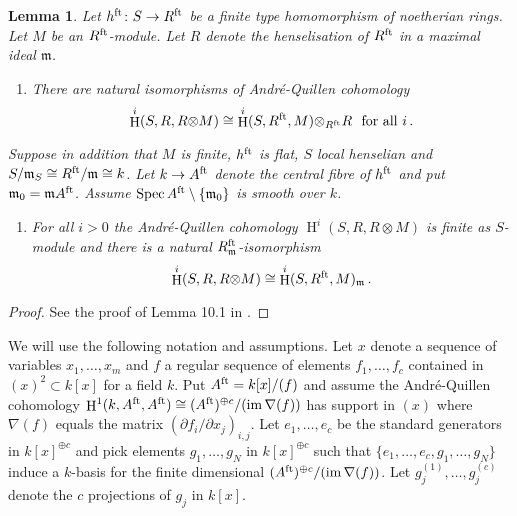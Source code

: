 \documentclass[a4paper,10pt]{amsart}
\theoremstyle{plain}
\newtheorem{lem}[xx]{Lemma}%
\theoremstyle{definition}
\theoremstyle{remark}
\numberwithin{equation}{xx}
\DeclareMathOperator{\cH}{H}
\DeclareMathOperator{\im}{im}
\DeclareMathOperator{\Spec}{Spec}
\newcommand{\co}{\colon}
\newcommand{\ra}{\rightarrow}
\newcommand{\ot}{{\otimes}}
\newcommand{\fr}[1]{\mathfrak{{#1}}}
\begin{document}
\begin{lem}\label{lem.AQhens}
Let \(h^{\textnormal{ft}}\co S\ra R^{\textnormal{ft}}\) be a finite type homomorphism of noetherian rings\textup{.} Let \(M\) be an \(R^{\textnormal{ft}}\)-module\textup{.} Let \(R\) denote the henselisation of \(R^{\textnormal{ft}}\) in a maximal ideal \(\fr{m}\)\textup{.} 
\begin{enumerate}
\item[(a)] There are natural isomorphisms of Andr{\'e}-Quillen cohomology
\begin{equation*}
\cH^{i}(S,R,R\ot M)\cong\cH^{i}(S, R^{\textnormal{ft}},M)\ot_{R^{\textnormal{ft}}}R\,\,\text{ for all } i\,.
\end{equation*}
\end{enumerate}
Suppose in addition that \(M\) is finite\textup{,} \(h^{\textnormal{ft}}\) is flat\textup{,} \(S\) local henselian and \(S/\fr{m}_{S}\cong R^{\textnormal{ft}}/\fr{m}\cong k\)\textup{.} 
Let \(k\ra A^{\textnormal{ft}}\) denote the central fibre of \(h^{\textnormal{ft}}\) and put \(\fr{m}_{0}=\fr{m}A^{\textnormal{ft}}\)\textup{.} Assume \(\Spec A^{\textnormal{ft}} \setminus\{\fr{m}_{0}\}\) is smooth over \(k\)\textup{.}
\begin{enumerate}
\item[(b)] For all \(i>0\) the Andr{\'e}-Quillen cohomology \(\cH^{i}(S,R,R\ot M)\) is finite as \(S\)-module and there is a natural \(R^{\textnormal{ft}}_{\fr{m}}\)-isomorphism
\begin{equation*}
\cH^{i}(S,R,R\ot M)\cong\cH^{i}(S, R^{\textnormal{ft}},M)_{\fr{m}}\,.
\end{equation*}
\end{enumerate}
\end{lem}
\begin{proof}
See the proof of Lemma 10.1 in \cite{ile:11x}.
\end{proof}
We will use the following notation and assumptions. Let \(x\) denote a sequence of variables \(x_{1},\dots,x_{m}\) and \(f\) a regular sequence of elements \(f_{1},\dots,f_{c}\) contained in \((x)^{2}\subset k[x]\) for a field \(k\). Put \(A^{\textnormal{ft}}=k[x]/(f)\) and assume the Andr{\'e}-Quillen cohomology \(\cH^{1}(k,A^{\textnormal{ft}},A^{\textnormal{ft}}) \cong (A^{\textnormal{ft}})^{\oplus c}/(\im\nabla(f))\) has support in \((x)\) where \(\nabla(f)\) equals the matrix \((\partial f_{i}/\partial x_{j})_{i,j}\). Let \(e_{1},\dots,e_{c}\) be the standard generators in \(k[x]^{\oplus c}\) and pick elements \(g_{1},\dots,g_{N}\) in \(k[x]^{\oplus c}\) such that \(\{e_{1},\dots,e_{c},g_{1},\dots,g_{N}\}\) induce a \(k\)-basis for the finite dimensional \((A^{\textnormal{ft}})^{\oplus c}/(\im\nabla(f))\). Let \(g_{j}^{(1)},\dots,g_{j}^{(c)}\) denote the \(c\) projections of \(g_{j}\) in \(k[x]\). 
\end{document}
